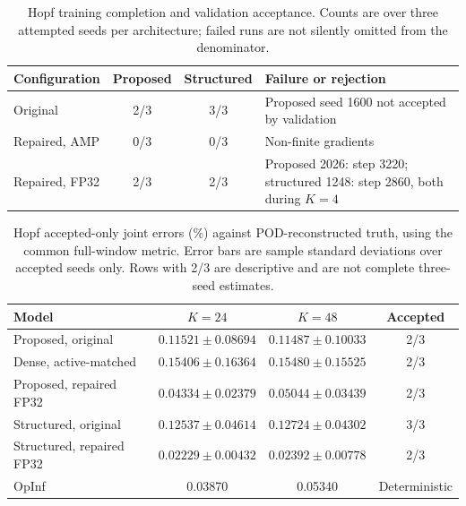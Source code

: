 \documentclass{article}
\begin{document}
\begin{table}[H]
\centering
\caption{Hopf training completion and validation acceptance.
Counts are over three attempted seeds per architecture; failed runs
are not silently omitted from the denominator.}
\label{tab:hopf_completion}
\small
\begin{tabular}{@{}lccp{5.8cm}@{}}
\toprule
Configuration & Proposed & Structured & Failure or rejection\\
\midrule
Original & 2/3 & 3/3 & Proposed seed 1600 not accepted by validation\\
Repaired, AMP & 0/3 & 0/3 & Non-finite gradients\\
Repaired, FP32 & 2/3 & 2/3 & Proposed 2026: step 3220; structured 1248:
step 2860, both during $K=4$\\
\bottomrule
\end{tabular}
\end{table}





\begin{table}[H]
\centering
\caption{Hopf accepted-only joint errors (\%) against POD-reconstructed
truth, using the common full-window metric. Error bars are sample
standard deviations over accepted seeds only. Rows with 2/3 are
descriptive and are not complete three-seed estimates.}
\label{tab:hopf_accepted}
\small
\begin{tabular}{@{}lccc@{}}
\toprule
Model & $K=24$ & $K=48$ & Accepted\\
\midrule
Proposed, original & $0.11521\pm0.08694$ & $0.11487\pm0.10033$ & 2/3\\
Dense, active-matched & $0.15406\pm0.16364$ & $0.15480\pm0.15525$ & 2/3\\
Proposed, repaired FP32 & $0.04334\pm0.02379$ & $0.05044\pm0.03439$ & 2/3\\
Structured, original & $0.12537\pm0.04614$ & $0.12724\pm0.04302$ & 3/3\\
Structured, repaired FP32 & $0.02229\pm0.00432$ & $0.02392\pm0.00778$ & 2/3\\
OpInf & 0.03870 & 0.05340 & Deterministic\\
\bottomrule
\end{tabular}
\end{table}
\end{document}
